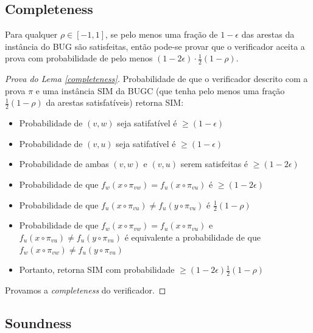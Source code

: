 \documentclass[12pt,a4paper]{article}
\begin{document}
\begin{itemize}
\subsection{Completeness}
    \begin{lema} \label{completeness}
        Para qualquer $\rho \in [-1,1]$, se pelo menos uma fração de $1-\epsilon$ das arestas da instância do BUG são satisfeitas, então pode-se provar que o verificador aceita a prova com probabilidade de pelo menos $(1-2\epsilon)\cdot \frac{1}{2}(1-\rho)$.
    \end{lema}
    \begin{proof}[Prova do Lema \ref{completeness}]
        \item Probabilidade de que o verificador descrito com a prova $\pi$ e uma instância SIM da BUGC (que tenha pelo menos uma fração $\frac{1}{2}(1-\rho)$ da arestas satisfatíveis) retorna SIM:
        \begin{itemize}
            \item Probabilidade de $(v,w)$ seja satifatível é $\geq (1-\epsilon)$
            \item Probabilidade de $(v,u)$ seja satifatível é $\geq (1-\epsilon)$
            \item Probabilidade de ambas $(v,w)$ e $(v,u)$ serem satisfeitas é $\geq (1-2\epsilon)$
            \item Probabilidade de que $f_w(x\circ \pi_{vw}) = f_u(x\circ \pi_{vu})$ é $\geq (1-2\epsilon)$
            \item Probabilidade de que $f_u(x\circ \pi_{vu})\ne f_u(y\circ \pi_{vu})$ é $\frac{1}{2}(1-\rho)$
            \item Probabilidade de que $f_w(x\circ \pi_{vw}) = f_u(x\circ \pi_{vu})$ e $f_u(x\circ \pi_{vu})\ne f_u(y\circ \pi_{vu})$ é equivalente a probabilidade de que $f_w(x\circ \pi_{vw})\ne f_u(y\circ \pi_{vu})$
            \item Portanto, retorna SIM com probabilidade $\geq (1-2\epsilon)\frac{1}{2}(1-\rho) $ 
        \end{itemize}
        
        \item Provamos a \textit{completeness} do verificador.
    \end{proof}


\subsection{Soundness} 
  

\end{itemize}
\end{document}
